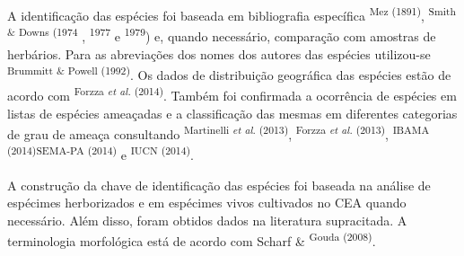 \begin{multicols}{2}
\par{}A identificação das espécies foi baseada em bibliografia específica \textsuperscript{Mez (\allowbreak{}1891)\allowbreak{}},\allowbreak{} \textsuperscript{Smith \&\allowbreak{\allowbreak{}\allowbreak{}}\allowbreak{} Downs (\allowbreak{}1974 },\allowbreak{} \textsuperscript{1977} e \textsuperscript{1979})\allowbreak{} e,\allowbreak{} quando necessário,\allowbreak{} comparação com amostras de herbários.\allowbreak{} Para as abreviações dos nomes dos autores das espécies utilizou-\allowbreak{}se \textsuperscript{Brummitt \&\allowbreak{\allowbreak{}\allowbreak{}}\allowbreak{} Powell (\allowbreak{}1992)\allowbreak{}}.\allowbreak{} Os dados de distribuição geográfica das espécies estão de acordo com \textsuperscript{Forzza \textit{et al.\allowbreak{}} (\allowbreak{}2014)\allowbreak{}}.\allowbreak{} Também foi confirmada a ocorrência de espécies em listas de espécies ameaçadas e a classificação das mesmas em diferentes categorias de grau de ameaça consultando \textsuperscript{Martinelli \textit{et al.\allowbreak{}} (\allowbreak{}2013)\allowbreak{}},\allowbreak{} \textsuperscript{Forzza \textit{et al.\allowbreak{}} (\allowbreak{}2013)\allowbreak{}},\allowbreak{} \textsuperscript{IBAMA (\allowbreak{}2014)\allowbreak{}}\textsuperscript{SEMA-\allowbreak{}PA (\allowbreak{}2014)\allowbreak{}} e \textsuperscript{IUCN (\allowbreak{}2014)\allowbreak{}}.\allowbreak{}\par{}A construção da chave de identificação das espécies foi baseada na análise de espécimes herborizados e em espécimes vivos cultivados no CEA quando necessário.\allowbreak{} Além disso,\allowbreak{} foram obtidos dados na literatura supracitada.\allowbreak{} A terminologia morfológica está de acordo com Scharf \&\allowbreak{\allowbreak{}\allowbreak{}}\allowbreak{} \textsuperscript{Gouda (\allowbreak{}2008)\allowbreak{}}.\allowbreak{}

\end{multicols}

